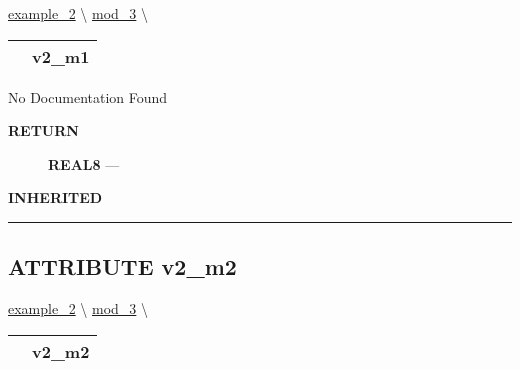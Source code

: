 \hypertarget{ecldoc:intest.inintest.example_2.mod_1.v2_m1}{}
\hspace{0pt} \hyperlink{ecldoc:intest.inintest.example_2}{example_2} \textbackslash 
\hspace{0pt} \hyperlink{ecldoc:intest.inintest.example_2.mod_3}{mod_3} \textbackslash 

{\renewcommand{\arraystretch}{1.5}
\begin{tabularx}{\textwidth}{|>{\raggedright\arraybackslash}l|X|}
\hline
\hspace{0pt}\mytexttt{\color{red} } & \textbf{v2\_m1} \\
\hline
\end{tabularx}
}

\par





No Documentation Found








\par
\begin{description}
\item [\colorbox{tagtype}{\color{white} \textbf{\textsf{RETURN}}}] \textbf{REAL8} --- 
\end{description}






\par
\begin{description}
\item [\colorbox{tagtype}{\color{white} \textbf{\textsf{INHERITED}}}] 
\end{description}



\rule{\linewidth}{0.5pt}
\subsection*{\textsf{\colorbox{headtoc}{\color{white} ATTRIBUTE}
v2\_m2}}

\hypertarget{ecldoc:intest.inintest.example_2.mod_2.v2_m2}{}
\hspace{0pt} \hyperlink{ecldoc:intest.inintest.example_2}{example_2} \textbackslash 
\hspace{0pt} \hyperlink{ecldoc:intest.inintest.example_2.mod_3}{mod_3} \textbackslash 

{\renewcommand{\arraystretch}{1.5}
\begin{tabularx}{\textwidth}{|>{\raggedright\arraybackslash}l|X|}
\hline
\hspace{0pt}\mytexttt{\color{red} } & \textbf{v2\_m2} \\
\hline
\end{tabularx}
}

